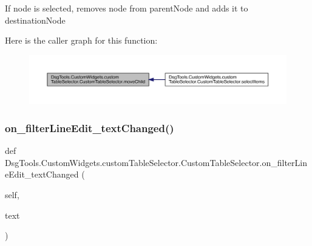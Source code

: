 \begin{DoxyVerb}If node is selected, removes node from parentNode and adds it to destinationNode
\end{DoxyVerb}
 Here is the caller graph for this function\+:
\nopagebreak
\begin{figure}[H]
\begin{center}
\leavevmode
\includegraphics[width=350pt]{class_dsg_tools_1_1_custom_widgets_1_1custom_table_selector_1_1_custom_table_selector_a41662c4764dcefb9e1adf6e70ca30f4f_icgraph}
\end{center}
\end{figure}
\mbox{\label{class_dsg_tools_1_1_custom_widgets_1_1custom_table_selector_1_1_custom_table_selector_a2990b2a9df0c5cf1e77c928be02e01c8}} 
\subsubsection{\texorpdfstring{on\+\_\+filter\+Line\+Edit\+\_\+text\+Changed()}{on\_filterLineEdit\_textChanged()}}
{\footnotesize\ttfamily def Dsg\+Tools.\+Custom\+Widgets.\+custom\+Table\+Selector.\+Custom\+Table\+Selector.\+on\+\_\+filter\+Line\+Edit\+\_\+text\+Changed (\begin{DoxyParamCaption}\item[{}]{self,  }\item[{}]{text }\end{DoxyParamCaption})}

